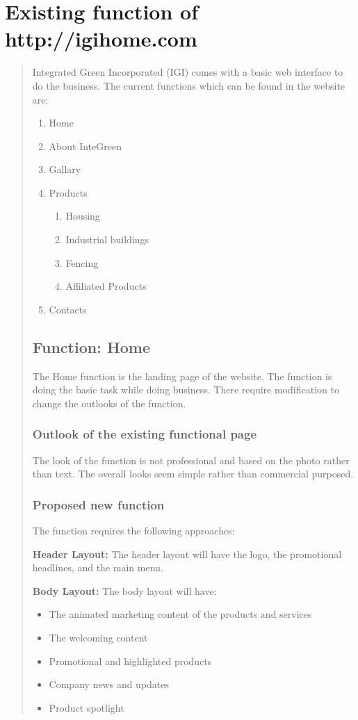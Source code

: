 \documentclass[35pt]{report}
\begin{document}
		\section{Existing function of http://igihome.com}
		\begin{quote}
		Integrated Green Incorporated (IGI) comes with a basic web interface to do the business. The current functions which can be found in the website are: 
		\begin{enumerate}
			\item Home
			\item About InteGreen 
			\item Gallary 
			\item Products 
				\begin{enumerate}
					\item Housing 
					\item Industrial buildings 
					\item Fencing 
					\item Affiliated Products 
				\end{enumerate}	
			\item Contacts 
		\end{enumerate}
			
			\subsection{Function: Home}
			The Home function is the landing page of the website. The function is doing the 
basic task while doing business. There require modification to change the outlooks 
of the function. 

				\subsubsection{Outlook of the existing functional page}
				The look of the function is not professional and based on the photo rather than text. 
The overall looks seem simple rather than commercial purposed. 

				\subsubsection{Proposed new function}
				The function requires the following approaches:

				{\bfseries Header Layout:} The header layout will have the logo, the promotional headlines, and the main menu.     

				{\bfseries Body Layout:} The body layout will have:
				\begin{itemize}
					\item The animated marketing content of the products and services 
					\item The welcoming content 
					\item Promotional and highlighted products 
					\item Company news and updates 
					\item Product spotlight 
				\end{itemize}


\end{quote}
\end{document}
